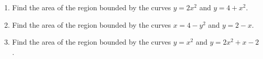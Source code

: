 \begin{enumerate}[ref={\fcProblemRef}]
\item \label{problemAreaBetweeny=2x^2,y=4+x^2} Find the area of the region bounded by the curves $y = 2x^2$ and $y = 4 + x^2$.

\item \label{problemAreaBetweeny=2-x,x=4-y^2} Find the area of the region bounded by the curves $x = 4 - y^2$ and $y = 2 - x$.

\item \label{problemAreaBetweeny=x^2} Find the area of the region bounded by the curves $y=x^2$ and $y=2x^2+x-2$.

\end{enumerate}
